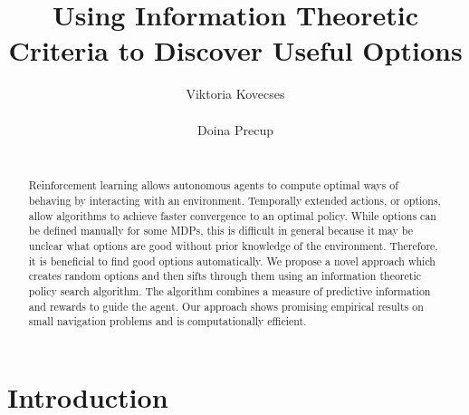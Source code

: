 \documentclass{acm_proc_article-sp}
\begin{document}
\title{Using Information Theoretic Criteria to Discover Useful Options}


%
\author{
\alignauthor
Viktoria Kovecses\\
       \\
\alignauthor
Doina Precup\\
       \\
}

\maketitle
\begin{abstract}

	Reinforcement learning allows autonomous agents to compute optimal ways of behaving by interacting with an environment. Temporally extended actions, or options, allow algorithms to achieve faster convergence to an optimal policy. While options can be defined manually for some MDPs, this is difficult in general because it may be unclear what options are good without prior knowledge of the environment. Therefore, it is beneficial to find good options automatically. We propose a novel approach which creates random options and then sifts through them using an information theoretic policy search algorithm. The algorithm combines a measure of predictive information and rewards to guide the agent. Our approach shows promising empirical results on small navigation problems and is computationally efficient. 
	
\end{abstract}




\section{Introduction}
\end{document}
